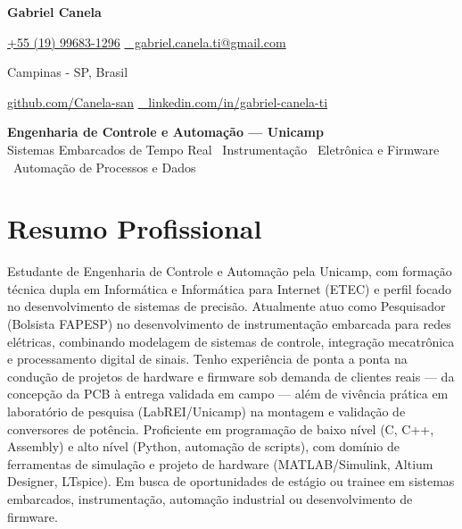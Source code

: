 \documentclass[a4paper,11pt]{article}
\begin{document}
\noindent
\begin{minipage}[t]{0.52\textwidth}
\textcolor{accent}{\textbf{\Huge Gabriel Canela}}
\end{minipage}%
\begin{minipage}[t]{0.48\textwidth}
\raggedleft

\href{tel:+5519996831296}{\faPhone \space +55 (19) 99683-1296} \quad
\href{mailto:gabriel.canela.ti@gmail.com}{\faEnvelope ~ gabriel.canela.ti@gmail.com}

\vspace{2pt}

\faMapMarker \space Campinas - SP, Brasil

\vspace{2pt}

\href{https://github.com/Canela-san}{\faGithub \space github.com/Canela-san} \quad
\href{https://www.linkedin.com/in/gabriel-canela-ti/}{\faLinkedin ~ linkedin.com/in/gabriel-canela-ti}
\end{minipage}

\vspace{0.6em}

\begin{center}
{\Large\bfseries\color{accent} Engenharia de Controle e Automação --- Unicamp}\\[3pt]
{\normalsize\color{graytext} Sistemas Embarcados de Tempo Real \textperiodcentered\ Instrumentação \textperiodcentered\ Eletrônica e Firmware \textperiodcentered\ Automação de Processos e Dados}
\end{center}

\vspace{0.3em}

\section*{Resumo Profissional}

Estudante de Engenharia de Controle e Automação pela Unicamp, com formação técnica dupla em Informática e Informática para Internet (ETEC) e perfil focado no desenvolvimento de sistemas de precisão. Atualmente atuo como Pesquisador (Bolsista FAPESP) no desenvolvimento de instrumentação embarcada para redes elétricas, combinando modelagem de sistemas de controle, integração mecatrônica e processamento digital de sinais. Tenho experiência de ponta a ponta na condução de projetos de hardware e firmware sob demanda de clientes reais --- da concepção da PCB à entrega validada em campo --- além de vivência prática em laboratório de pesquisa (LabREI/Unicamp) na montagem e validação de conversores de potência. Proficiente em programação de baixo nível (C, C++, Assembly) e alto nível (Python, automação de scripts), com domínio de ferramentas de simulação e projeto de hardware (MATLAB/Simulink, Altium Designer, LTspice). %
Em busca de oportunidades de estágio ou trainee em sistemas embarcados, instrumentação, automação industrial ou desenvolvimento de firmware.
\end{document}
